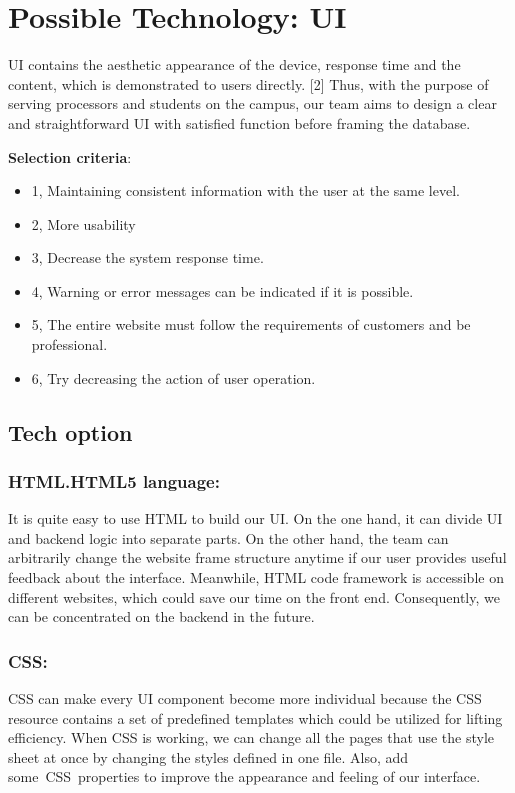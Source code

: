 \documentclass[onecolumn, draftclsnofoot,10pt, compsoc]{IEEEtran}
\begin{document}
\section{Possible Technology: UI}
UI contains the aesthetic appearance of the device, response time and the content, which is demonstrated to users directly. [2] Thus, with the purpose of serving processors and students on the campus, our team aims to design a clear and straightforward UI with satisfied function before framing the database. 

\textbf{Selection criteria}: \begin{itemize}
  \item 1, Maintaining consistent information with the user at the same level.
  \item 2, More usability 
  \item 3, Decrease the system response time. 
  \item 4, Warning or error messages can be indicated if it is possible. 
  \item 5, The entire website must follow the requirements of customers and be professional.
  \item 6, Try decreasing the action of user operation. 
\end{itemize}
\subsection{Tech option}
\subsubsection{HTML.HTML5 language: }
  It is quite easy to use HTML to build our UI. On the one hand, it can divide UI and backend logic into separate parts. On the other hand, the team can arbitrarily change the website frame structure anytime if our user provides useful feedback about the interface. Meanwhile, HTML code framework is accessible on different websites, which could save our time on the front end. Consequently, we can be concentrated on the backend in the future. 

\subsubsection{CSS: }
CSS can make every UI component become more individual because the CSS resource contains a set of predefined templates which could be utilized for lifting efficiency. When CSS is working, we can change all the pages that use the style sheet at once by changing the styles defined in one file. Also, add some CSS properties to improve the appearance and feeling of our interface.
\end{document}
